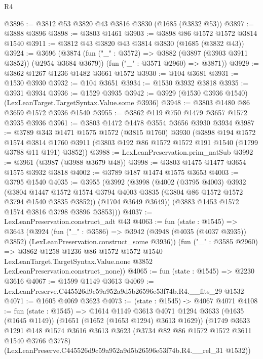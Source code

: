 \begin{lexlean}{R4}
\begin{coremodule}
@3896 := @3812 @53 @3820 @43 @3816 @3830 (@1685 (@3832 @53))
@3897 := @3888 @3896
@3898 := @3803 @1461
@3903 := @3898 @86 @1572 @1572 @3814 @1540
@3911 := @3812 @43 @3820 @43 @3814 @3830 (@1685 (@3832 @43))
@3924 := @3696
    (@3874
      (fun ("_" : @3572) => @3882 (@3897 (@3903 @3911 @3852)) (@2954 @3684 @3679))
      (fun ("_" : @3571 @2960) => @3871))
@3929 := @3862 @1267 @1236 @1482 @3661 @1572
@3930 := @104 @3681
@3931 := @1530 @3930
@3932 := @104 @3651
@3934 := @1530 @3932 @3818
@3935 := @3931 @3934
@3936 := @1529 @3935
@3942 := @3929 (@1530 @3936 @1540) (LexLeanTarget.TargetSyntax.Value.some @3936)
@3948 := @3803 @1480 @86 @3659 @1572 @3936 @1540
@3955 := @3862 @119 @750 @1479 @3657 @1572 @3935 @3936
@3961 := @3803 @1472 @1478 @3554 @3656 @3930 @3934
@3987 := @3789
    @343
    @1471
    @1575
    @1572
    (@3815 @1760)
    @3930
    (@3898
      @194
      @1572
      @1574
      @3814
      @1760
      @3911
      (@3803 @192 @86 @1572 @1572 @191 @1540 (@1799 @3788 @11 @191) @3852))
@3988 := LexLeanPreservation.prim_natSub
@3992 := @3961 (@3987 (@3988 @3679 @48))
@3998 := @3803 @1475 @1477 @3654 @1575 @3932 @3818
@4002 := @3789 @187 @1474 @1575 @3653
@4003 := @3795 @1540
@4035 := @3955
    (@3992
      (@3998
        (@4002
          (@3795 @4003)
          @3932
          (@3804
            @1447
            @1572
            @1574
            @3794
            @4003
            @3835
            (@3804 @86 @1572 @1572 @3794 @1540 @3835 @3852))
          (@1704 @3649 @3649))
        (@3883 @1453 @1572 @1574 @3816 @3798 @3896 @3853)))
@4037 := LexLeanPreservation.construct_adt @43
@4063 := fun (state : @1545) =>
  @3643
    (@3924
      (fun ("_" : @3586) =>
      @3942 (@3948 (@4035 (@4037 @3935)) @3852) (LexLeanPreservation.construct_some @3936))
      (fun ("_" : @3585 @2960) =>
      @3862
        @1258
        @1236
        @86
        @1572
        @1572
        @1540
        LexLeanTarget.TargetSyntax.Value.none
        @3852
        LexLeanPreservation.construct_none))
@4065 := fun (state : @1545) => @2230 @3616
@4067 := @1599 @1149 @3613
@4069 := LexLeanPreserve.C445526d9c59a952a9d5b26596e53f74b.R4.__fits_29 @1532
@4071 := @1605 @4069 @3623
@4073 := (state : @1545) -> @4067 @4071
@4108 := fun (state : @1545) =>
  @1614
    @1149
    @3613
    @4071
    @1294
    @3633
    (@1635 (@1645 @1149))
    (@1651 (@1652 (@1653 @1294) @3613 @1629))
    (@1749
      @3633
      @1291
      @148
      @1574
      @3616
      @3613
      @3623
      (@3734 @82 @86 @1572 @1572 @3611 @1540 @3766 @3778)
      (LexLeanPreserve.C445526d9c59a952a9d5b26596e53f74b.R4.__rel_31 @1532))

\end{coremodule}
\end{lexlean}
